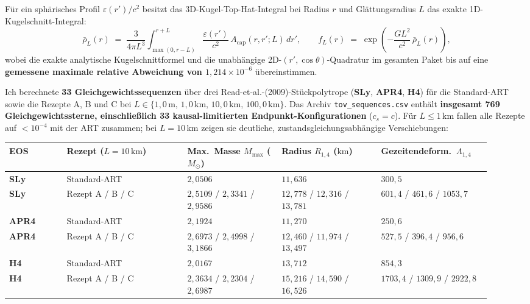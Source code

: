 \documentclass[10pt,a4paper]{article}
\begin{document}
\par
F\"ur ein sph\"arisches Profil $\varepsilon(r')/c^2$ besitzt das 3D-Kugel-Top-Hat-Integral bei Radius $r$ und Gl\"attungsradius $L$ das exakte 1D-Kugelschnitt-Integral:
\begin{equation}
  \bar{\rho}_L(r) \;=\; \frac{3}{4\pi L^3}\int_{\max(0,r-L)}^{r+L} \frac{\varepsilon(r')}{c^2}\,A_{\text{cap}}(r,r';L)\,dr', \qquad
  f_L(r) \;=\; \exp\!\left(-\frac{G L^2}{c^2}\,\bar{\rho}_L(r)\right),
\end{equation}
wobei die exakte analytische Kugelschnittformel und die unab\-h\"angige 2D-$(r',\cos\theta)$-Quadratur im gesamten Paket bis auf eine \textbf{gemessene maximale relative Abweichung von $1{,}214\times 10^{-6}$} \"ubereinstimmen.

\par
Ich berechnete \textbf{33 Gleichgewichtssequenzen} \"uber drei Read-et-al.-(2009)-St\"uckpolytrope (\textbf{SLy}, \textbf{APR4}, \textbf{H4}) f\"ur die Standard-ART sowie die Rezepte A, B und C bei $L \in \{1{,}0\,\text{m},\,1{,}0\,\text{km},\,10{,}0\,\text{km},\,100{,}0\,\text{km}\}$. Das Archiv \texttt{tov\_sequences.csv} enth\"alt \textbf{insgesamt 769 Gleichgewichtssterne, einschlie\ss lich 33 kausal-limitierten Endpunkt-Konfigurationen} ($c_s = c$). F\"ur $L \le 1\,\text{km}$ fallen alle Rezepte auf $<10^{-4}$ mit der ART zusammen; bei $L = 10\,\text{km}$ zeigen sie deutliche, zustandsgleichungsabh\"angige Verschiebungen:

\begin{center}\vspace{-3pt}
{\footnotesize
\begin{tabular}{@{}>{\bfseries}p{0.11\linewidth}p{0.23\linewidth}p{0.18\linewidth}p{0.19\linewidth}p{0.21\linewidth}@{}}
\toprule
EOS & Rezept ($L = 10\,\text{km}$) & Max.\ Masse $M_{\max}$ ($M_\odot$) & Radius $R_{1{,}4}$ ($\text{km}$) & Gezeitendeform.\ $\Lambda_{1{,}4}$ \\
\midrule
SLy & Standard-ART & $2{,}0506$ & $11{,}636$ & $300{,}5$ \\
SLy & Rezept A / B / C & $2{,}5109$ / $2{,}3341$ / $2{,}9586$ & $12{,}778$ / $12{,}316$ / $13{,}781$ & $601{,}4$ / $461{,}6$ / $1053{,}7$ \\
APR4 & Standard-ART & $2{,}1924$ & $11{,}270$ & $250{,}6$ \\
APR4 & Rezept A / B / C & $2{,}6973$ / $2{,}4998$ / $3{,}1866$ & $12{,}460$ / $11{,}974$ / $13{,}497$ & $527{,}5$ / $396{,}4$ / $956{,}6$ \\
H4 & Standard-ART & $2{,}0167$ & $13{,}712$ & $854{,}3$ \\
H4 & Rezept A / B / C & $2{,}3634$ / $2{,}2304$ / $2{,}6987$ & $15{,}216$ / $14{,}590$ / $16{,}526$ & $1703{,}4$ / $1309{,}9$ / $2922{,}8$ \\
\bottomrule
\end{tabular}}
\end{center}
\end{document}
